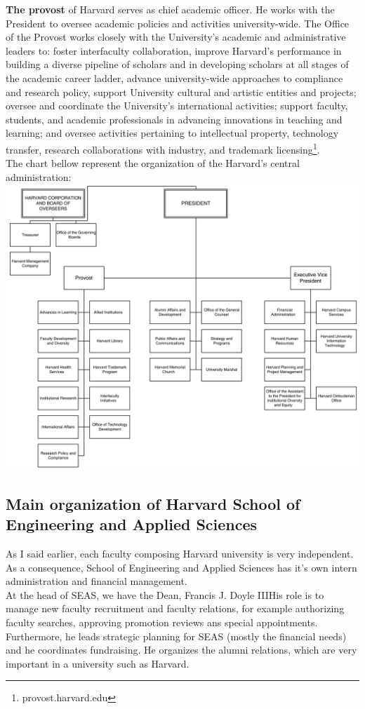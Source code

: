 \documentclass[10pt,a4paper]{article}
\newcommand{\seas}{School of Engineering and Applied Sciences}
\newcommand{\hseas}{Harvard School of Engineering and Applied Sciences}
\begin{document}
\textbf{The provost} of Harvard serves as chief academic officer. He works with the President to oversee academic policies and activities university-wide. The Office of the Provost works closely with the University’s academic and administrative leaders to: foster interfaculty collaboration, improve Harvard’s performance in building a diverse pipeline of scholars and in developing scholars at all stages of the academic career ladder, advance university-wide approaches to compliance and research policy, support University cultural and artistic entities and projects; oversee and coordinate the University’s international activities; support faculty, students, and academic professionals in advancing innovations in teaching and learning; and oversee activities pertaining to intellectual property, technology transfer, research collaborations with industry, and trademark licensing\footnote{provost.harvard.edu}.\\
The chart bellow represent the organization of the Harvard's central administration:\\
\includegraphics[width=1\textwidth]{images/chart2.png}

\subsection{Main organization of \hseas{}}
As I said earlier, each faculty composing Harvard university is very independent. As a consequence, \seas{} has it's own intern administration and financial management.\\
At the head of SEAS, we have the Dean, Francis J. Doyle III\@ His role is to manage new faculty recruitment and faculty relations, for example authorizing faculty searches, approving promotion reviews ans special appointments. Furthermore, he leads strategic planning for SEAS (mostly the financial needs) and he coordinates fundraising. He organizes the alumni relations, which are very important in a university such as Harvard.\\
\end{document}
